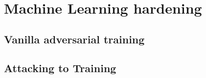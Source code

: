 \section{Machine Learning hardening}\label{sec:ml-hardening}

\subsection{Vanilla adversarial training}\label{subsec:adversarial-training}

\subsection{Attacking to Training}\label{subsec:a2t}
